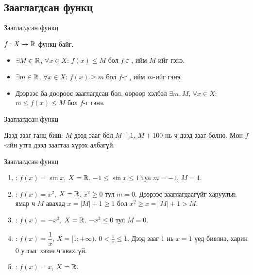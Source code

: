 \subsection{Зааглагдсан функц}
\begin{frame}[allowframebreaks]{Зааглагдсан функц}
\begin{definition}
$f:X\to\mathbb{R}$ функц байг.
\begin{itemize}
  \item $\exists M\in\mathbb{R}$, $\forall x\in X$: $f(x)\le M$ бол $f$-г ,
        ийм $M$-ийг  гэнэ.
  \item $\exists m\in\mathbb{R}$, $\forall x\in X$: $f(x)\ge m$ бол $f$-г ,
        ийм $m$-ийг  гэнэ.
  \item Дээрээс ба доороос зааглагдсан бол, өөрөөр хэлбэл
        $\exists m,M$, $\forall x\in X$: $m\le f(x)\le M$ бол $f$-г  гэнэ.
\end{itemize}
\end{definition}
\end{frame}

\begin{frame}[allowframebreaks]{Зааглагдсан функц}
\begin{remark}
Дээд зааг ганц биш: $M$ дээд зааг бол $M+1$, $M+100$ нь ч дээд зааг болно.
Мөн $f$-ийн утга дээд заагтаа хүрэх албагүй.
\end{remark}
\end{frame}

\begin{frame}[allowframebreaks]{Зааглагдсан функц}
\begin{example}
\leavevmode
\begin{enumerate}
  \item {}: $f(x)=\sin x$, $X=\mathbb{R}$. \; $-1\le\sin x\le 1$ тул $m=-1$, $M=1$.
  \item {}: $f(x)=x^2$, $X=\mathbb{R}$. \; $x^2\ge0$ тул $m=0$.
        Дээрээс зааглагдаагүйг харуулъя: ямар ч $M$ авахад $x=|M|+1\ge1$ бол
        $x^2\ge x=|M|+1>M$.
  \item {}: $f(x)=-x^2$, $X=\mathbb{R}$. \; $-x^2\le0$ тул $M=0$.
  \item {}: $f(x)=\dfrac1x$, $X=[1;+\infty)$.
        \; $0<\frac1x\le1$. Дээд зааг $1$ нь $x=1$ үед биелнэ, харин $0$ утгыг хэзээ ч авахгүй.
  \item {}: $f(x)=x$, $X=\mathbb{R}$.
\end{enumerate}
\end{example}
\end{frame}


